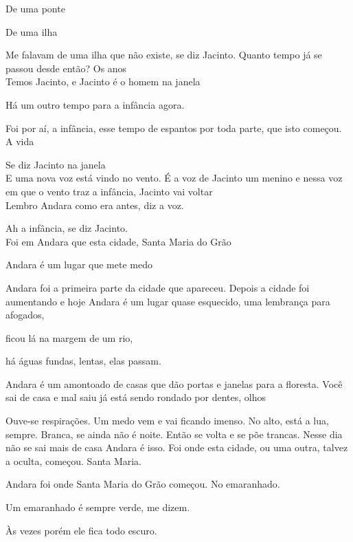 \vspace*{4cm}

De uma ponte

De uma ilha

Me falavam de uma ilha que não existe, se diz Jacinto. Quanto tempo já
se passou desde então? Os anos\\

Temos Jacinto, e Jacinto é o homem na janela

\pagebreak

\vspace*{4cm}

Há um outro tempo para a infância agora.

Foi por aí, a infância, esse tempo de espantos por toda parte, que isto
começou. A vida

Se diz Jacinto na janela\\

E uma nova voz está vindo no vento. É a voz de Jacinto um menino e nessa
voz em que o vento traz a infância, Jacinto vai voltar\\

Lembro Andara como era antes, diz a voz.

Ah a infância, se diz Jacinto.\\

Foi em Andara que esta cidade, Santa Maria do Grão

Andara é um lugar que mete medo

Andara foi a primeira parte da cidade que apareceu. Depois a cidade foi
aumentando e hoje Andara é um lugar quase esquecido, uma lembrança para
afogados,

ficou lá na margem de um rio,

há águas fundas, lentas, elas passam.

Andara é um amontoado de casas que dão portas e janelas para a floresta.
Você sai de casa e mal saiu já está sendo rondado por dentes, olhos

Ouve-se respirações. Um medo vem e vai ficando imenso. No alto, está a
lua, sempre. Branca, se ainda não é noite. Então se volta e se põe
trancas. Nesse dia não se sai mais de casa Andara é isso. Foi onde esta
cidade, ou uma outra, talvez a oculta, começou. Santa Maria.

Andara foi onde Santa Maria do Grão começou. No emaranhado.

Um emaranhado é sempre verde, me dizem.

Às vezes porém ele fica todo escuro.


